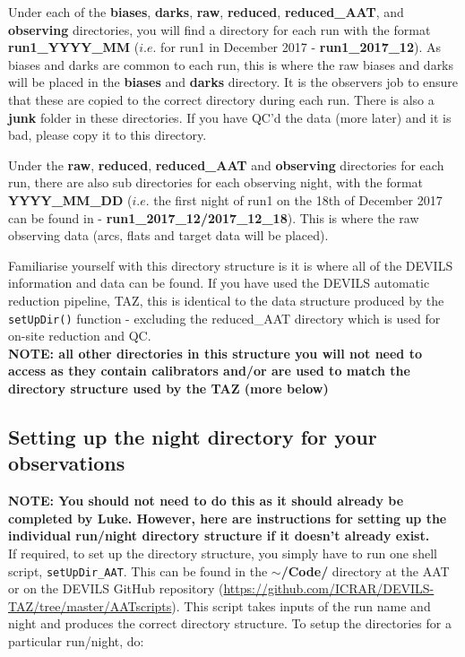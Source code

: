 \documentclass[12pt]{article}
\begin{document}
Under each of the \textbf{biases}, \textbf{darks}, \textbf{raw}, \textbf{reduced}, \textbf{reduced\_AAT},  and \textbf{observing} directories, you will find a directory for each run with the format \textbf{run1\_YYYY\_MM} ($i.e.$ for run1 in December 2017 - \textbf{run1\_2017\_12}). As biases and darks are common to each run, this is where the raw biases and darks will be placed in the \textbf{biases} and \textbf{darks} directory. It is the observers job to ensure that these are copied to the correct directory during each run. There is also a \textbf{junk} folder in these directories. If you have QC'd the data (more later) and it is bad, please copy it to this directory. 

Under the \textbf{raw}, \textbf{reduced}, \textbf{reduced\_AAT} and \textbf{observing} directories for each run, there are also sub directories for each observing night, with the format \textbf{YYYY\_MM\_DD} ($i.e.$ the first night of run1 on the 18th of December 2017 can be found in - \textbf{run1\_2017\_12/2017\_12\_18}). This is where the raw observing data (arcs, flats and target data will be placed).

Familiarise yourself with this directory structure is it is where all of the DEVILS information and data can be found. If you have used the DEVILS automatic reduction pipeline, TAZ, this is identical to the data structure produced by the \texttt{setUpDir()} function - excluding the reduced\_AAT directory which is used for on-site reduction and QC. \\

\textcolor{PineGreen}{\textbf{NOTE: all other directories in this structure you will not need to access as they contain calibrators and/or are used to match the directory structure used by the TAZ (more below)}}\\


\subsection{Setting up the night directory for your observations}

\textcolor{PineGreen}{\textbf{NOTE: You should not need to do this as it should already be completed by Luke. However, here are instructions for setting up the individual run/night directory structure if it doesn't already exist.}} \\

If required, to set up the directory structure, you simply have to run one shell script, \texttt{setUpDir\_AAT}. This can be found in the \textbf{$\sim$/Code/} directory at the AAT or on the DEVILS GitHub repository (\url{https://github.com/ICRAR/DEVILS-TAZ/tree/master/AATscripts}). This script  takes inputs of the run name and night and produces the correct directory structure. To setup the directories for a particular run/night, do:\\
\end{document}
